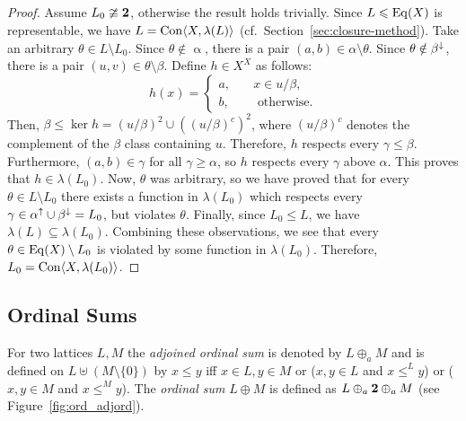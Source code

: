 \begin{proof}
  Assume $L_0 \ncong \mathbf{2}$, otherwise the result holds trivially. 
  Since $L\leqslant \operatorname{Eq}(X)$ is representable, we have $L = \operatorname{Con}
  \langle X, \lambda(L)\rangle$ (cf.~Section~\ref{sec:closure-method}).  Take an arbitrary
  $\theta \in L \setminus L_0$. Since $\theta \notin \upalpha$, 
  there is a pair 
  $(a,b) \in \alpha \setminus \theta$.  Since $\theta \notin \beta^{\downarrow}$, there is
  a pair $(u,v)\in \theta\setminus \beta$. Define $h\in X^X$ as follows:
  \begin{equation}
    \label{eq:h}
    h(x) = \begin{cases}
      a,& \quad x\in u/\beta,\\
      b,& \quad \text{ otherwise.}
    \end{cases}
  \end{equation}
  Then, $\beta \leq \ker h = (u/\beta)^2 \cup ((u/\beta)^c)^2$, where $(u/\beta)^c$ denotes the
  complement of the $\beta$ class containing $u$.  Therefore, $h$ respects every
  $\gamma \leq \beta$.  Furthermore, $(a, b) \in \gamma$ for all $\gamma \geq \alpha$,
  so $h$ respects every $\gamma$ above $\alpha$.  This proves that $h\in \lambda(L_0)$.
  Now, $\theta$ was arbitrary, so we have proved that for every $\theta \in L
  \setminus L_0$ there exists a function in $\lambda(L_0)$ which respects every
  $\gamma \in \alpha^{\uparrow}\cup \beta^{\downarrow} = L_0$, but violates $\theta$.  Finally,
  since 
  $L_0 \leq L$, we have $\lambda(L)\subseteq \lambda(L_0)$.  Combining these
  observations, we see that every $\theta \in \operatorname{Eq}(X) \setminus L_0$ is
  violated by some function in $\lambda(L_0)$. Therefore, $L_0 = \operatorname{Con} \langle X, \lambda(L_0)\rangle$.
\end{proof}

\subsection{Ordinal Sums}
\label{sec:ordinal-sums}
For two lattices $L,M$ the \emph{adjoined ordinal sum}  
is denoted by $L\oplus_a M$ and is defined on $L\uplus (M\setminus\{0\})$
by $x\le y$ iff $x\in L,y\in M$ or ($x,y\in L$ and $x\le^L y$) or ($x,y\in M$
and $x\le^M y$). The \emph{ordinal sum} $L\oplus M$ is defined as $L\oplus_a\mathbf{2}\oplus_a M$ (see Figure~\ref{fig:ord_adjord}).

